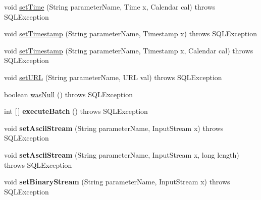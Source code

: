 \begin{DoxyCompactItemize}
\item 
void \mbox{\hyperlink{classcom_1_1mysql_1_1cj_1_1jdbc_1_1_callable_statement_ab2ce9627abfa776a9a481cc4f496d2ae}{set\+Time}} (String parameter\+Name, Time x, Calendar cal)  throws S\+Q\+L\+Exception 
\item 
void \mbox{\hyperlink{classcom_1_1mysql_1_1cj_1_1jdbc_1_1_callable_statement_a5032ac718b4fbbb1cfd23077cc37ec20}{set\+Timestamp}} (String parameter\+Name, Timestamp x)  throws S\+Q\+L\+Exception 
\item 
void \mbox{\hyperlink{classcom_1_1mysql_1_1cj_1_1jdbc_1_1_callable_statement_adeaf8f538114ab776d3f9063134709a7}{set\+Timestamp}} (String parameter\+Name, Timestamp x, Calendar cal)  throws S\+Q\+L\+Exception 
\item 
void \mbox{\hyperlink{classcom_1_1mysql_1_1cj_1_1jdbc_1_1_callable_statement_ad9619f612112c6427341179cd909a058}{set\+U\+RL}} (String parameter\+Name, U\+RL val)  throws S\+Q\+L\+Exception 
\item 
boolean \mbox{\hyperlink{classcom_1_1mysql_1_1cj_1_1jdbc_1_1_callable_statement_a49a33a86678de625aaf3d944363eb7d5}{was\+Null}} ()  throws S\+Q\+L\+Exception 
\item 
\mbox{\label{classcom_1_1mysql_1_1cj_1_1jdbc_1_1_callable_statement_ad2aca8b3dc5657731e6015075cea280d}} 
int \mbox{[}$\,$\mbox{]} {\bfseries execute\+Batch} ()  throws S\+Q\+L\+Exception 
\item 
\mbox{\label{classcom_1_1mysql_1_1cj_1_1jdbc_1_1_callable_statement_ab80d76a28a17c36b707a575291016da0}} 
void {\bfseries set\+Ascii\+Stream} (String parameter\+Name, Input\+Stream x)  throws S\+Q\+L\+Exception 
\item 
\mbox{\label{classcom_1_1mysql_1_1cj_1_1jdbc_1_1_callable_statement_a329a1f253c6e16eb93caabb187fc30f6}} 
void {\bfseries set\+Ascii\+Stream} (String parameter\+Name, Input\+Stream x, long length)  throws S\+Q\+L\+Exception 
\item 
\mbox{\label{classcom_1_1mysql_1_1cj_1_1jdbc_1_1_callable_statement_a9266c20a0842adfeca30fe7fbb3cf76b}} 
void {\bfseries set\+Binary\+Stream} (String parameter\+Name, Input\+Stream x)  throws S\+Q\+L\+Exception 

\end{DoxyCompactItemize}
